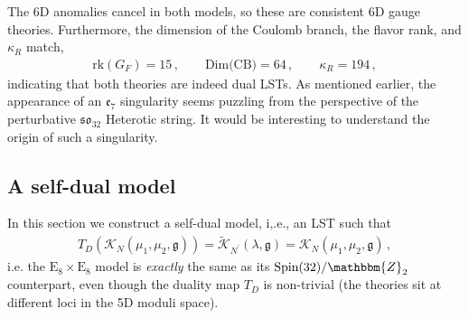 \documentclass[11pt]{article}
\numberwithin{equation}{section}
\newcommand{\fg}{\mathfrak{g}}
\begin{document}
The 6D anomalies cancel in both models, so these are consistent 6D gauge theories. Furthermore, the dimension of the Coulomb branch, the flavor rank, and $\kappa_{R}$ match, 
\begin{align}
\text{rk}(G_F)=15\, , \qquad     \text{Dim(CB)}=64 \, , \qquad \kappa_{R}=194\,,
\end{align} 
indicating that both theories are indeed dual  LSTs. As mentioned earlier, the appearance of an $\mathfrak{e}_{7}$ singularity seems puzzling from the perspective of the perturbative $\mathfrak{so}_{32}$ Heterotic string. It would be interesting to understand the origin of such a singularity.


\subsection{A self-dual model}
In this section we construct a self-dual model, i,.e., an LST such that
\begin{align}
   T_D(\mathcal{K}_N (\mu_1, \mu_2, \fg)) = \tilde{\mathcal{K}}_{N^\prime} (\lambda, \fg) = \mathcal{K}_N (\mu_1, \mu_2, \fg) \, ,
\end{align}
i.e. the $\text{E}_8 \times \text{E}_8$ model is \textit{exactly} the same as its $\text{Spin}(32)/\mathbbm{Z}_2$ counterpart, even though the duality map $T_D$ is non-trivial (the theories sit at different loci in the 5D moduli space). 
\end{document}
